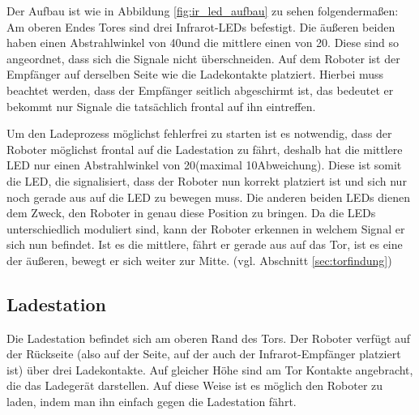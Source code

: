 Der Aufbau ist wie in Abbildung \ref{fig:ir_led_aufbau} zu sehen folgendermaßen:
Am oberen Endes Tores sind drei Infrarot-LEDs befestigt. Die äußeren beiden haben einen Abstrahlwinkel von 40\degree  und die mittlere einen von 20\degree. Diese sind so angeordnet, dass sich die Signale nicht überschneiden. Auf dem Roboter ist der Empfänger auf derselben Seite wie die Ladekontakte platziert. Hierbei muss beachtet werden, dass der Empfänger seitlich abgeschirmt ist, das bedeutet er bekommt nur Signale die tatsächlich frontal auf ihn eintreffen.

Um den Ladeprozess möglichst fehlerfrei zu starten ist es notwendig, dass der Roboter möglichst frontal auf die Ladestation zu fährt, deshalb hat die mittlere LED nur einen Abstrahlwinkel von 20\degree  (maximal 10\degree  Abweichung). Diese ist somit die LED, die signalisiert, dass der Roboter nun korrekt platziert ist und sich nur noch gerade aus auf die LED zu bewegen muss. Die anderen beiden LEDs dienen dem Zweck, den Roboter in genau diese Position zu bringen. Da die LEDs unterschiedlich moduliert sind, kann der Roboter erkennen in welchem Signal er sich nun befindet. Ist es die mittlere, fährt er gerade aus auf das Tor, ist es eine der äußeren, bewegt er sich weiter zur Mitte. (vgl. Abschnitt \ref{sec:torfindung})


\subsection{Ladestation}
Die Ladestation befindet sich am oberen Rand des Tors. Der Roboter verfügt auf der Rückseite (also auf der Seite, auf der auch der Infrarot-Empfänger platziert ist) über drei Ladekontakte. Auf gleicher Höhe sind am Tor Kontakte angebracht, die das Ladegerät darstellen. Auf diese Weise ist es möglich den Roboter zu laden, indem man ihn einfach gegen die Ladestation fährt.

